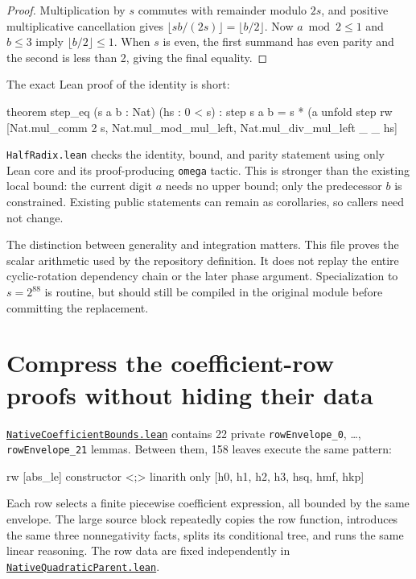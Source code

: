 \documentclass[11pt,letterpaper]{article}
\newcommand{\code}[1]{\nolinkurl{#1}}
\newcommand{\src}[2]{\href{https://github.com/VladimirReshetnikov/ProveIt/blob/60e9c5d620c6c387d932876cfa2d9376f64ea56c/Computability/DiophantineConsistency/Lean/DiophantineConsistency/#1.lean}{\code{#1.lean}}#2}
\begin{document}
\begin{proof}
Multiplication by $s$ commutes with remainder modulo $2s$, and positive
multiplicative cancellation gives $\lfloor sb/(2s)\rfloor=\lfloor b/2\rfloor$.
Now $a\bmod2\le1$ and $b\le3$ imply $\lfloor b/2\rfloor\le1$.
When $s$ is even, the first summand has even parity and the second is less
than 2, giving the final equality.
\end{proof}

The exact Lean proof of the identity is short:

\begin{Lean}
theorem step_eq (s a b : Nat) (hs : 0 < s) :
    step s a b = s * (a %
  unfold step
  rw [Nat.mul_comm 2 s, Nat.mul_mod_mul_left,
    Nat.mul_div_mul_left _ _ hs]
\end{Lean}

\code{HalfRadix.lean} checks the identity, bound, and parity statement using
only Lean core and its proof-producing \code{omega} tactic. This is stronger
than the existing local bound: the current digit $a$ needs no upper bound;
only the predecessor $b$ is constrained. Existing public statements can remain
as corollaries, so callers need not change.

The distinction between generality and integration matters. This file proves
the scalar arithmetic used by the repository definition. It does not replay
the entire cyclic-rotation dependency chain or the later phase argument.
Specialization to $s=2^{88}$ is routine, but should still be compiled in the
original module before committing the replacement.

\section{Compress the coefficient-row proofs without hiding their data}
\label{sec:rows}

\src{NativeCoefficientBounds}{ contains 22 private
\code{rowEnvelope_0}, \ldots, \code{rowEnvelope_21} lemmas.}
Between them, 158 leaves execute the same pattern:

\begin{Lean}
rw [abs_le]
constructor <;>
  linarith only [h0, h1, h2, h3, hsq, hmf, hkp]
\end{Lean}

Each row selects a finite piecewise coefficient expression, all bounded by
the same envelope. The large source block repeatedly copies the row function,
introduces the same three nonnegativity facts, splits its conditional tree,
and runs the same linear reasoning. The row data are fixed independently in
\src{NativeQuadraticParent}{.}
\end{document}
